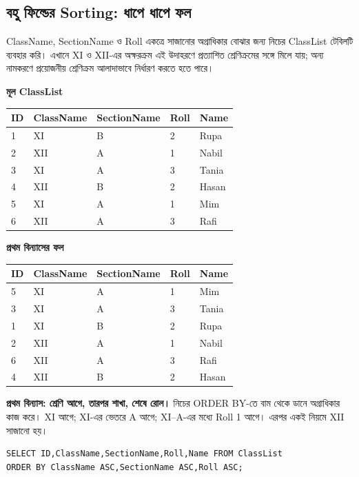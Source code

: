 \subsection{বহু ফিল্ডের Sorting: ধাপে ধাপে ফল}
ClassName, SectionName ও Roll একত্রে সাজানোর অগ্রাধিকার বোঝার জন্য নিচের ClassList টেবিলটি ব্যবহার করি। এখানে XI ও XII-এর অক্ষরক্রম এই উদাহরণে প্রত্যাশিত শ্রেণিক্রমের সঙ্গে মিলে যায়; অন্য নামকরণে প্রয়োজনীয় শ্রেণিক্রম আলাদাভাবে নির্ধারণ করতে হতে পারে।
\begin{chSixSideBySide}[.48]
\small\setlength{\tabcolsep}{2pt}\textbf{মূল ClassList}\par
\begin{tabular}{|l|l|l|l|l|}\hline
ID & ClassName & SectionName & Roll & Name\\\hline
1 & XI & B & 2 & Rupa\\\hline
2 & XII & A & 1 & Nabil\\\hline
3 & XI & A & 3 & Tania\\\hline
4 & XII & B & 2 & Hasan\\\hline
5 & XI & A & 1 & Mim\\\hline
6 & XII & A & 3 & Rafi\\\hline
\end{tabular}

\chSixNextColumn
\small\setlength{\tabcolsep}{2pt}\textbf{প্রথম বিন্যাসের ফল}\par
\begin{tabular}{|l|l|l|l|l|}\hline
ID & ClassName & SectionName & Roll & Name\\\hline
5 & XI & A & 1 & Mim\\\hline
3 & XI & A & 3 & Tania\\\hline
1 & XI & B & 2 & Rupa\\\hline
2 & XII & A & 1 & Nabil\\\hline
6 & XII & A & 3 & Rafi\\\hline
4 & XII & B & 2 & Hasan\\\hline
\end{tabular}

\end{chSixSideBySide}

\textbf{প্রথম বিন্যাস: শ্রেণি আগে, তারপর শাখা, শেষে রোল।} নিচের ORDER BY-তে বাম থেকে ডানে অগ্রাধিকার কাজ করে। XI আগে; XI-এর ভেতরে A আগে; XI--A-এর মধ্যে Roll 1 আগে। এরপর একই নিয়মে XII সাজানো হয়।
\begin{verbatim}
SELECT ID,ClassName,SectionName,Roll,Name FROM ClassList
ORDER BY ClassName ASC,SectionName ASC,Roll ASC;
\end{verbatim}

